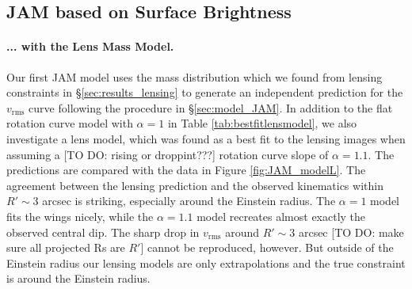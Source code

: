 \subsection{JAM based on Surface Brightness} \label{sec:results_JAM_SB}

\paragraph{... with the Lens Mass Model.} Our first JAM model uses the mass distribution which we found from lensing constraints in \S\ref{sec:results_lensing} to generate an independent prediction for the $v_\text{rms}$ curve following the procedure in \S\ref{sec:model_JAM}. In addition to the flat rotation curve model with $\alpha = 1$ in Table \ref{tab:bestfitlensmodel}, we also investigate a lens model, which was found as a best fit to the lensing images when assuming a [TO DO: rising or droppint???] rotation curve slope of $\alpha=1.1$. The predictions are compared with the data in Figure \ref{fig:JAM_modelL}. The agreement between the lensing prediction and the observed kinematics within $R' \sim 3$ arcsec is striking, especially around the Einstein radius. The $\alpha = 1$ model fits the wings nicely, while the $\alpha = 1.1$ model recreates almost exactly the observed central dip. The sharp drop in $v_\text{rms}$ around $R' \sim 3$ arcsec [TO DO: make sure all projected Rs are $R'$] cannot be reproduced, however. But outside of the Einstein radius our lensing models are only extrapolations and the true constraint is around the Einstein radius.


